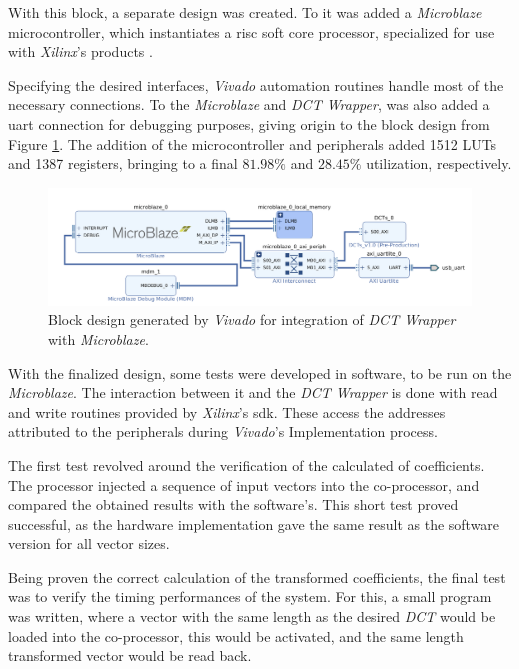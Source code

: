 
With this block, a separate design was created. To it was added a \emph{Microblaze} microcontroller, which instantiates a \gls{risc} soft core processor, specialized for use with \emph{Xilinx}'s products \cite{MicroBlazeProcessorReference2019a}. 

Specifying the desired interfaces, \emph{Vivado} automation routines handle most of the necessary connections. To the \emph{Microblaze} and \emph{DCT Wrapper}, was also added a \gls{uart} connection for debugging purposes, giving origin to the block design from Figure \ref{fig:blockdes}. The addition of the microcontroller and peripherals added 1512 LUTs and 1387 registers, bringing to a final $81.98\%$ and $28.45\%$ utilization, respectively.

\begin{figure}[htb]
    \centering
    \includegraphics[width=\textwidth]{Sections/4DevelopedArchitecture/Figures/DCTCop.png}
    \caption{Block design generated by \emph{Vivado} for integration of \emph{DCT Wrapper} with \emph{Microblaze}.}
    \label{fig:blockdes}
\end{figure}

With the finalized design, some tests were developed in software, to be run on the \emph{Microblaze}. The interaction between it and the \emph{DCT Wrapper} is done with read and write routines provided by \emph{Xilinx}'s \gls{sdk}. These access the addresses attributed to the peripherals during \emph{Vivado}'s Implementation process.

The first test revolved around the verification of the calculated of coefficients. The processor injected a sequence of input vectors into the co-processor, and compared the obtained results with the software's. This short test proved successful, as the hardware implementation gave the same result as the software version for all vector sizes.

Being proven the correct calculation of the transformed coefficients, the final test was to verify the timing performances of the system. For this, a small program was written, where a vector with the same length as the desired \emph{DCT} would be loaded into the co-processor, this would be activated, and the same length transformed vector would be read back.

